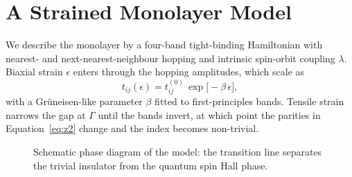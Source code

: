 \chapter{A Strained Monolayer Model}
\label{ch:model}

We describe the monolayer by a four-band tight-binding Hamiltonian with nearest- and
next-nearest-neighbour hopping and intrinsic spin-orbit coupling $\lambda$. Biaxial strain
$\epsilon$ enters through the hopping amplitudes, which scale as
\begin{equation}
  t_{ij}(\epsilon) = t_{ij}^{(0)} \, \exp\!\bigl[-\beta\,\epsilon\bigr],
  \label{eq:hopping}
\end{equation}
with a Gr\"uneisen-like parameter $\beta$ fitted to first-principles bands. Tensile strain
narrows the gap at $\Gamma$ until the bands invert, at which point the parities in
Equation~\eqref{eq:z2} change and the index becomes non-trivial.

\begin{figure}[htbp]
  \centering
  \caption[Schematic phase diagram of the model]{Schematic phase diagram of the model: the transition line separates the trivial
  insulator from the quantum spin Hall phase.}
  \label{fig:phase}
\end{figure}
